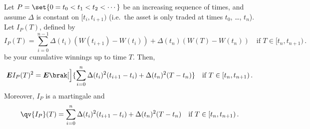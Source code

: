 \begin{lemma}\label{l:3dito}
Let $P = \set{0 = t_0 < t_1 < t_2 < \cdots}$ be an increasing sequence of times, and assume $\Delta$ is constant on $[t_i, t_{i+1})$ (i.e.\ the asset is only traded at times $t_0$, \dots, $t_n$).
Let $I_P(T)$, defined by
\begin{equation*}
  I_P(T)
    = \sum_{i=0}^{n-1} \Delta(t_i) (W(t_{i+1}) - W(t_i))
      + \Delta(t_n) (W(T) - W(t_n))
  \quad\text{if } T \in [t_n, t_{n+1})\,.
\end{equation*}
be your cumulative winnings up to time $T$.
Then,
\begin{equation}\label{e:3Eip2}
  \E I_P(T)^2
    = \E \brak[\Big]{ \sum_{i=0}^{n} \Delta(t_i)^2 (t_{i+1} - t_i)
      + \Delta(t_n)^2 (T - t_n) }
  \quad\text{if } T \in [t_n, t_{n+1})\,.
\end{equation}
Moreover, $I_P$ is a martingale and
\begin{equation}\label{e:3dqv}
  \qv{I_P}(T) = \sum_{i=0}^{n} \Delta(t_i)^2 (t_{i+1} - t_i)
      + \Delta(t_n)^2 (T - t_n)
  \quad\text{if } T \in [t_n, t_{n+1})\,.
\end{equation}
\end{lemma}


